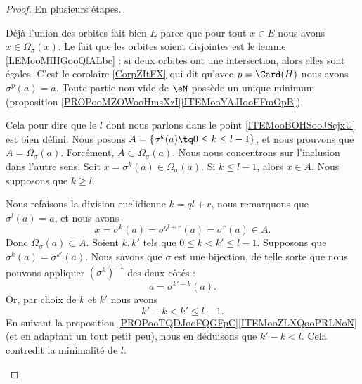 \begin{proof}
	En plusieurs étapes.
	\begin{subproof}
		Déjà l'union des orbites fait bien \( E\) parce que pour tout \( x\in E\) nous avons \( x\in\Omega_{\sigma}(x)\). Le fait que les orbites soient disjointes est le lemme \ref{LEMooMIHGooQfALbc} : si deux orbites ont une intersection, alors elles sont égales.
		C'est le corolaire \ref{CorpZItFX} qui dit qu'avec \( p=\Card(H)\) nous avons \( \sigma^p(a)=a\). Toute partie non vide de \( \eN\) possède un unique minimum (proposition \ref{PROPooMZOWooHmsXzI}\ref{ITEMooYAJIooEFmOpB}).

		Cela pour dire que le \( l\) dont nous parlons dans le point \ref{ITEMooBOHSooJScjxU} est bien défini.
		Nous posons \( A=\{ \sigma^k(a)\tq 0\leq k\leq l-1 \}\), et nous prouvons que \( A=\Omega_{\sigma}(a)\). Forcément, \( A\subset \Omega_{\sigma}(a)\). Nous nous concentrons sur l'inclusion dans l'autre sens. Soit \( x=\sigma^k(a)\in\Omega_{\sigma}(a)\). Si \( k\leq l-1\), alors \( x\in A\). Nous supposons que \( k\geq l\).

		Nous refaisons la division euclidienne \( k=ql+r\), nous remarquons que \( \sigma^l(a)=a\), et nous avons
		\begin{equation}
			x=\sigma^k(a)=\sigma^{ql+r}(a)=\sigma^r(a)\in A.
		\end{equation}
		Donc \( \Omega_{\sigma}(a)\subset A\).
		Soient \( k,k'\) tels que \( 0\leq k<k'\leq l-1\). Supposons que \( \sigma^k(a)=\sigma^{k'}(a)\). Nous savons que \( \sigma\) est une bijection, de telle sorte que nous pouvons appliquer \( (\sigma^k)^{-1}\) des deux côtés :
		\begin{equation}
			a=\sigma^{k'-k}(a).
		\end{equation}
		Or, par choix de \( k\) et \( k'\) nous avons
		\begin{equation}
			k'-k<k'\leq l-1.
		\end{equation}
		En suivant la proposition \ref{PROPooTQDJooFQGFpC}\ref{ITEMooZLXQooPRLNoN} (et en adaptant un tout petit peu), nous en déduisons que \( k'-k<l\). Cela contredit la minimalité de \( l\).
	\end{subproof}
\end{proof}


